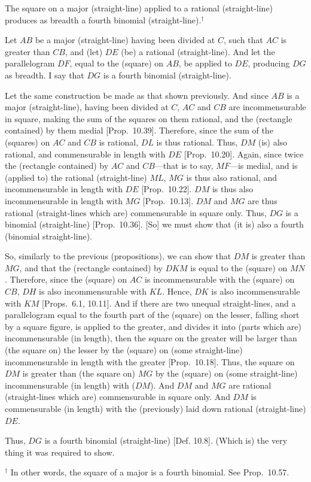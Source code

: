 \begin{Parallel}{}{}
{The square on a major (straight-line) applied
to a rational (straight-line)  produces as breadth a fourth binomial (straight-line).$^\dag$

Let $AB$ be a major (straight-line) having been divided at $C$, such that
$AC$ is greater than $CB$, and (let) $DE$ (be)  a rational (straight-line). And
let the parallelogram $DF$, equal to the (square) on $AB$, be
applied to $DE$, producing $DG$ as breadth. I say that
$DG$ is a fourth binomial (straight-line).

\epsfysize=1.6in 
\centerline{}

Let the same construction be made as that shown previously.
And since $AB$ is a major (straight-line), having been divided at $C$, $AC$ and
$CB$ are incommensurable in square, making the sum of the squares
on them rational, and the (rectangle contained) by them medial [Prop.~10.39]. Therefore, since the sum of the
(squares) on $AC$ and $CB$ is rational, $DL$ is thus rational.
Thus, $DM$ (is) also rational, and commensurable in length with $DE$ [Prop.~10.20]. Again, since twice the (rectangle
contained) by $AC$ and $CB$---that is to say, $MF$---is medial,
and is (applied to) the rational (straight-line) $ML$,  $MG$
is thus also rational, and incommensurable in length with $DE$ [Prop.~10.22]. $DM$ is thus also incommensurable
in length with $MG$ [Prop.~10.13]. $DM$
and $MG$ are thus rational (straight-lines which are) commensurable
in square only. Thus, $DG$ is a binomial (straight-line) [Prop.~10.36]. [So] we must show that (it is)
also a fourth (binomial straight-line).

So, similarly to the previous (propositions), we can show that $DM$ is
greater than $MG$, and that the (rectangle contained) by $DKM$
is equal to the (square) on $MN$. Therefore, since the (square) on $AC$
is incommensurable with the (square) on $CB$, $DH$ is also incommensurable
with $KL$. Hence, $DK$ is also incommensurable with $KM$
[Props.~6.1, 10.11].
And if there are two unequal straight-lines, and a parallelogram
equal to the fourth part of the (square) on the lesser, falling short
by a square figure, is applied to the greater, and divides it
into (parts which are) incommensurable (in length), then the square on
the greater will be larger than (the square on) the lesser by the
(square) on (some straight-line) incommensurable in length
with the greater [Prop.~10.18]. Thus,
the square on $DM$ is greater than (the square on) $MG$ by the
(square) on (some straight-line) incommensurable (in length) with ($DM$). And
$DM$ and $MG$ are rational (straight-lines which are) commensurable
in square only. And $DM$ is commensurable (in length)
with the (previously) laid down rational (straight-line) $DE$.

Thus, $DG$ is a fourth binomial (straight-line) [Def. 10.8]. (Which is) the very thing it was required
to show.}
\end{Parallel}
{\footnotesize\noindent$^\dag$ In other words, the square of a major is a
fourth binomial. See Prop.~10.57.\\}

